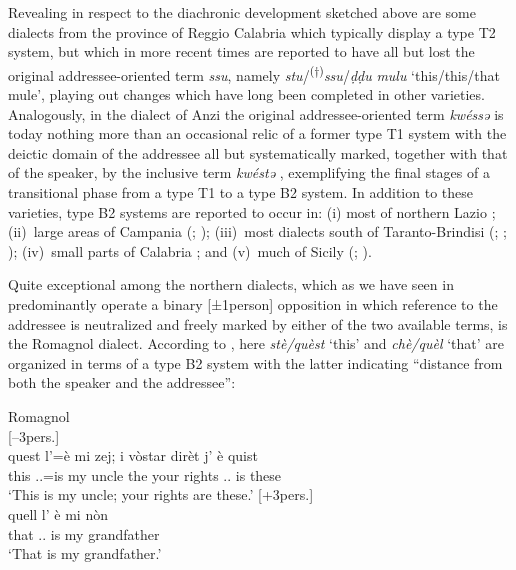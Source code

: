 \documentclass[output=paper]{langsci/langscibook}
\begin{document}
Revealing in respect to the diachronic development sketched above are some
dialects from the province of Reggio Calabria which typically display a type T2
system, but which in more recent times are reported
\citep[129]{Loporcaro:2009a} to have all but lost the original
addressee-oriented term \emph{ssu}, namely
\emph{stu}/\textsuperscript{(†)}\emph{ssu}/\emph{ḍḍu} \emph{mulu}
‘this/this/that mule’, playing out changes which have long been completed in
other varieties. Analogously, in the dialect of Anzi the original
addressee-oriented term \emph{kwéssə} is today nothing more than an occasional
relic of a former type T1 system with the deictic domain of the addressee all
but systematically marked, together with that of the speaker, by the inclusive
term \emph{kwéstə} \citep[50]{Ruggieri:1992a}, exemplifying the final stages of
a transitional phase from a type T1 to a type B2 system. In addition to
these varieties, type B2 systems are reported to occur in: (i) most of
northern Lazio \citep[140]{Stavinschi:2009a}; (ii)~large areas of Campania
(\citealt[74]{Parascandola:1976a}; \citealt[79, 81f]{Castagna:1982a}); (iii)~most 
dialects south of Taranto-Brindisi (\citealt[16, 36]{Mancarella:1975a};
\citealt[159]{Mancarella:1998a}; \citealt[129f]{Loporcaro:2009a}); (iv)~small
parts of Calabria \citep[33]{Tassone:2000a}; and (v)~much of Sicily
(\citealt[722]{Varvaro:1988a}; \citealt[92]{ledgeway2004sviluppo}).

Quite exceptional among the northern  dialects, which as we have seen in
 predominantly operate a binary
[±1person] opposition in which reference to the addressee is neutralized and
freely marked by either of the two available terms, is the Romagnol dialect.
According to \citet[64f]{Masotti:1999a}, here \emph{stè/quèst} ‘this’ and
\emph{chè/quèl} ‘that’ are organized in terms of a type B2 system with
the latter indicating \enquote{distance from both the speaker and the
addressee}:

\ea Romagnol \citep{Masotti:1999a}\\
    \ea {}[--3pers.]\\
    \gll    quest  l’=è  mi  zej;  i  vòstar  dirèt  j’  è  quist \\
            this \Sbj.\Cl.\Tsg{}=is  my  uncle  the  your  rights  \Sbj.\Cl.\Tpl{} is  these\\
    \glt    \enquote*{This is my uncle; your rights are these.}
    \ex {}[+3pers.]\\
    \gll    quell  l’ è  mi  nòn\\
            that  \Sbj.\Cl.\Tsg{}  is  my  grandfather\\
    \glt    \enquote*{That is my grandfather.}
    \z
\z
\end{document}
